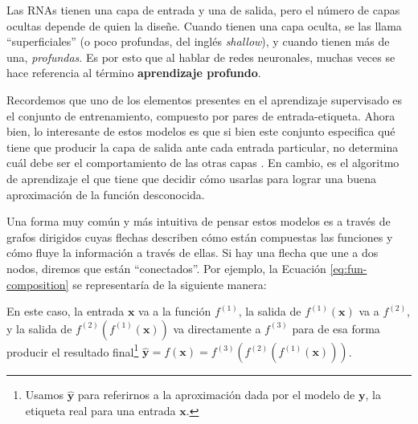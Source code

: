 \documentclass[../../main.tex]{subfiles}
\begin{document}
Las RNAs tienen una capa de entrada y una de salida, pero el número de capas ocultas
depende de quien la diseñe. Cuando tienen una capa oculta, se las llama ``superficiales''
(o poco profundas, del inglés \textit{shallow}), y cuando tienen más de una,
\textit{profundas}. Es por esto que al hablar de redes neuronales, muchas veces se
hace referencia al término \textbf{aprendizaje profundo}.

Recordemos que uno de los elementos presentes en el aprendizaje supervisado es el conjunto
de entrenamiento, compuesto por pares de entrada-etiqueta. Ahora bien, lo interesante de
estos modelos es que si bien este conjunto especifica qué tiene que producir la capa de
salida ante cada entrada particular, no determina cuál debe ser el comportamiento de las
otras capas \cite{deep-learning}. En cambio, es el algoritmo de aprendizaje el que tiene
que decidir cómo usarlas para lograr una buena aproximación de la función desconocida.

Una forma muy común y más intuitiva de pensar estos modelos es a través de grafos
dirigidos cuyas flechas describen cómo están compuestas las funciones y cómo fluye la
información a través de ellas. Si hay una flecha que une a dos nodos, diremos que están
``conectados''. Por ejemplo, la Ecuación \ref{eq:fun-composition} se representaría de la
siguiente manera:
\begin{center}
\end{center}

En este caso, la entrada \(\bm{x}\) va a la función \(f^{(1)}\), la salida de
\(f^{(1)}(\bm{x})\) va a \(f^{(2)}\), y la salida de \(f^{(2)}(f^{(1)}(\bm{x}))\) va
directamente a \(f^{(3)}\) para de esa forma producir el resultado final\footnote{Usamos
\(\bm{\hat{y}}\) para referirnos a la aproximación dada por el modelo de \(\bm{y}\), la
etiqueta real para una entrada \(\bm{x}\).} \(\bm{\hat{y}} = f(\bm{x}) =
f^{(3)}(f^{(2)}(f^{(1)}(\bm{x})))\).
\end{document}
